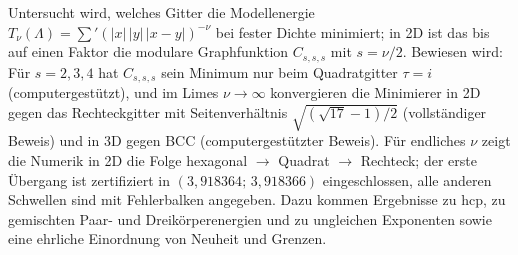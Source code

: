 Untersucht wird, welches Gitter die Modellenergie $T_\nu(\Lambda)=\sum'(|x|\,|y|\,|x-y|)^{-\nu}$ bei fester Dichte minimiert; in 2D ist das bis auf einen Faktor die modulare Graphfunktion $C_{s,s,s}$ mit $s=\nu/2$. Bewiesen wird: Für $s=2,3,4$ hat $C_{s,s,s}$ sein Minimum nur beim Quadratgitter $\tau=i$ (computergestützt), und im Limes $\nu\to\infty$ konvergieren die Minimierer in 2D gegen das Rechteckgitter mit Seitenverhältnis $\sqrt{(\sqrt{17}-1)/2}$ (vollständiger Beweis) und in 3D gegen BCC (computergestützter Beweis). Für endliches $\nu$ zeigt die Numerik in 2D die Folge hexagonal $\to$ Quadrat $\to$ Rechteck; der erste Übergang ist zertifiziert in $(3{,}918364;\,3{,}918366)$ eingeschlossen, alle anderen Schwellen sind mit Fehlerbalken angegeben. Dazu kommen Ergebnisse zu hcp, zu gemischten Paar- und Dreikörperenergien und zu ungleichen Exponenten sowie eine ehrliche Einordnung von Neuheit und Grenzen.
